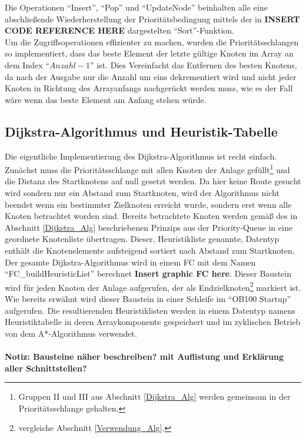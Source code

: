 			Die Operationen "`Insert"', "`Pop"' und "`UpdateNode"' beinhalten alle eine abschließende Wiederherstellung  der Prioritätsbedingung mittels der in \textbf{INSERT CODE REFERENCE HERE} dargestelten "`Sort"'-Funktion.\\
			Um die Zugriffsoperationen effizienter zu machen, wurden die Prioritätsschlangen so implementiert, dass das beste Element der letzte gültige Knoten im Array an dem Index "`$Anzahl - 1$"' ist. Dies Vereinfacht das Entfernen des besten Knotens, da nach der Ausgabe nur die Anzahl um eins dekrementiert wird und nicht jeder Knoten in Richtung des Arrayanfangs nachgerückt werden muss, wie es der Fall wäre wenn das beste Element am Anfang stehen würde.
			
		\subsection{Dijkstra-Algorithmus und Heuristik-Tabelle}
			
			Die eigentliche Implementierung des Dijkstra-Algorithmus ist recht einfach. Zunächst muss die Prioritätsschlange mit allen Knoten der Anlage gefüllt\footnote{Gruppen II und III aus Abschnitt \ref{Dijkstra_Alg} werden gemeinsam in der Prioritätsschlange gehalten.} und die Distanz des Startknotens auf null gesetzt werden. 
			Da hier keine Route gesucht wird sondern nur ein Abstand zum Startknoten, wird der Algorithmus nicht beendet wenn ein bestimmter Zielknoten erreicht wurde, sondern erst wenn alle Knoten betrachtet worden sind. Bereits betrachtete Knoten werden gemäß des in Abschnitt \ref{Dijkstra_Alg} beschriebenen Prinzips aus der Priority-Queue in eine geordnete Knotenliste übertragen. Dieser, Heuristikliste genannte, Datentyp enthält die Knotenelemente aufsteigend sortiert nach Abstand zum Startknoten.
			\\
			Der gesamte Dijkstra-Algorithmus wird in einem \ac{FC} mit dem Namen "`FC\_buildHeuristicList"' berechnet \textbf{Insert graphic FC here}. Dieser Baustein wird für jeden Knoten der Anlage aufgerufen, der als Endzielknoten\footnote{vergleiche Abschnitt \ref{Verwendung_Alg}.} markiert ist. Wie bereits erwähnt wird dieser Baustein in einer Schleife im "`\ac{OB}100 Startup"' aufgerufen. Die resultierenden Heuristiklisten werden in einem Datentyp namens Heuristiktabelle in deren Arraykomponente gespeichert und im zyklischen Betrieb von dem A*-Algorithmus verwendet. 
			\\
			\\
			\textbf{Notiz: Bausteine näher beschreiben? mit Auflistung und Erklärung aller Schnittstellen?}
			

